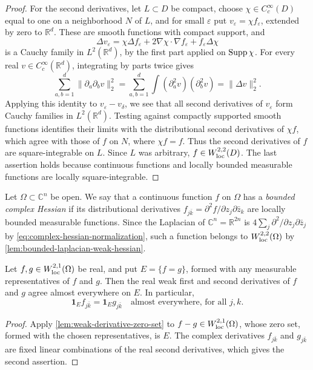 \begin{proof}
For the second derivatives, let $L\subset D$ be compact, choose $\chi\in C^\infty_c(D)$ equal to one on a neighborhood $N$ of $L$, and for small $\varepsilon$ put $v_\varepsilon=\chi f_\varepsilon$, extended by zero to $\mathbb R^d$. These are smooth functions with compact support, and
\[
 \Delta v_\varepsilon
 =\chi\Delta f_\varepsilon+2\nabla\chi\cdot\nabla f_\varepsilon
                                      +f_\varepsilon\Delta\chi
\]
is a Cauchy family in $L^2(\mathbb R^d)$, by the first part applied on $\operatorname{Supp}\chi$. For every real $v\in C^\infty_c(\mathbb R^d)$, integrating by parts twice gives
\[
 \sum_{a,b=1}^d\|\partial_a\partial_b v\|_2^2
 =\sum_{a,b=1}^d\int(\partial_a^2v)(\partial_b^2v)
 =\|\Delta v\|_2^2.
\]
Applying this identity to $v_\varepsilon-v_\delta$, we see that all second derivatives of $v_\varepsilon$ form Cauchy families in $L^2(\mathbb R^d)$. Testing against compactly supported smooth functions identifies their limits with the distributional second derivatives of $\chi f$, which agree with those of $f$ on $N$, where $\chi f=f$. Thus the second derivatives of $f$ are square-integrable on $L$. Since $L$ was arbitrary, $f\in W^{2,2}_{\mathrm{loc}}(D)$. The last assertion holds because continuous functions and locally bounded measurable functions are locally square-integrable.
\end{proof}

Let $\Omega\subset\mathbb C^n$ be open. We say that a continuous function $f$ on $\Omega$ has a \emph{bounded complex Hessian} if its distributional derivatives $f_{j\bar k}=\partial^2 f/\partial z_j\partial\bar z_k$ are locally bounded measurable functions. Since the Laplacian of $\mathbb C^n=\mathbb R^{2n}$ is $4\sum_j\partial^2/\partial z_j\partial\bar z_j$ by \eqref{eq:complex-hessian-normalization}, such a function belongs to $W^{2,2}_{\mathrm{loc}}(\Omega)$ by \cref{lem:bounded-laplacian-weak-hessian}.

\begin{proposition}\label{prop:bounded-complex-hessian-contact}
Let $f,g\in W^{2,1}_{\mathrm{loc}}(\Omega)$ be real, and put $E=\{f=g\}$, formed with any measurable representatives of $f$ and $g$. Then the real weak first and second derivatives of $f$ and $g$ agree almost everywhere on $E$. In particular,
\[
 \mathbf1_E f_{j\bar k}=\mathbf1_E g_{j\bar k}
 \quad\text{almost everywhere, for all }j,k.
\]
\end{proposition}
\begin{proof}
Apply \cref{lem:weak-derivative-zero-set} to $f-g\in W^{2,1}_{\mathrm{loc}}(\Omega)$, whose zero set, formed with the chosen representatives, is $E$. The complex derivatives $f_{j\bar k}$ and $g_{j\bar k}$ are fixed linear combinations of the real second derivatives, which gives the second assertion.
\end{proof}


